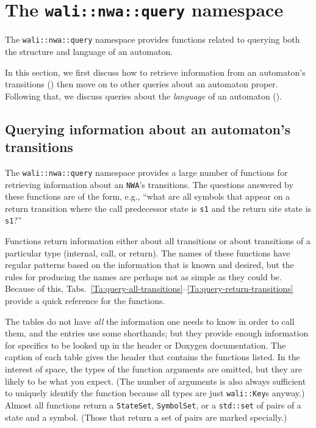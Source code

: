 \section{The \texttt{wali::nwa::query} namespace}
\label{Se:namespace-query}

The \texttt{wali::nwa::query} namespace provides functions related to
querying both the structure and language of an automaton.

In this section, we first discuss how to retrieve information from an
automaton's transitions () then move on to other
queries about an automaton proper.
Following that, we discuss queries about the
\textsl{language} of an automaton ().


\subsection{Querying information about an automaton's transitions}
\label{Se:query-transitions}
The \texttt{wali::nwa::query} namespace provides a large number of functions
for retrieving information about an \texttt{NWA}'s transitions. The questions
answered by these functions are of the form, e.g., ``what are all symbols that
appear on a return transition where the call predecessor state is \texttt{s1}
and the return site state is \texttt{s1}?''

Functions return information either about all transitions or about
transitions of a particular type (internal, call, or return). The names of
these functions have regular patterns based on the information that is
known and desired, but the rules for producing the names are perhaps not as
simple as they could be. Because of this,
Tabs.~\ref{Ta:query-all-transitions}--\ref{Ta:query-return-transitions}
provide a quick reference for the functions.

The tables do not have \textsl{all} the information one needs to know in
order to call them, and the entries use some shorthands; but they provide enough
information for specifics to be
looked up in the header or Doxygen documentation. The caption of each table
gives the header that contains the functions listed. In the interest of
space, the types of the function arguments are omitted, but they are likely to
be what you expect. (The number of arguments is also always sufficient to
uniquely identify the function because all types are just \texttt{wali::Key}s
anyway.) Almost all functions return a \texttt{StateSet}, \texttt{SymbolSet},
or a \texttt{std::set} of pairs of a state and a symbol. (Those that return a
set of pairs are marked specially.)


